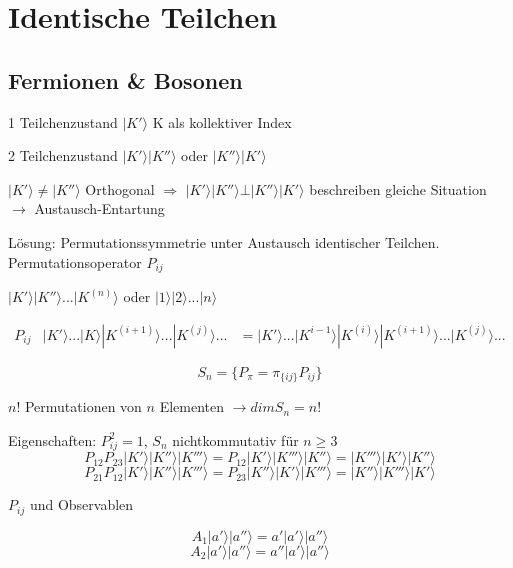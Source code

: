 



\tableofcontents
\setcounter{chapter}{3}
\chapter{Identische Teilchen}

\section{Fermionen \& Bosonen}

1 Teilchenzustand \(|K'\rangle \) K als kollektiver Index

2 Teilchenzustand \(|K'\rangle|K''\rangle \) oder \(|K''\rangle|K'\rangle \)

 \(|K'\rangle\neq |K''\rangle \) Orthogonal \(\Rightarrow \) \(|K'\rangle|K''\rangle \bot |K''\rangle|K'\rangle \) beschreiben gleiche Situation \(\rightarrow\) Austausch-Entartung

Lösung: Permutationssymmetrie unter Austausch identischer Teilchen. Permutationsoperator \(P_{ij}\)
 
\(|K'\rangle|K''\rangle...|K^{(n)}\rangle \) oder \(|1\rangle|2\rangle...|n\rangle \)

\begin{align}
P_{ij}&|K'\rangle ...|K\rangle|K^{(i+1)}\rangle ...|K^{(j)}\rangle ...
&=|K'\rangle ...|K^{i-1}\rangle|K^{(i)}\rangle|K^{(i+1)}\rangle ...|K^{(j)}\rangle ...
\end{align}

\[S_n = \{ P_\pi = \pi_{\{ij\}}P_{ij} \}\]

\(n!\) Permutationen von \(n\) Elementen \(\rightarrow dim S_n = n! \)

Eigenschaften: \(P^2_{ij}=1\), \(S_n\) nichtkommutativ für \(n\geq 3\)
\[P_{12}P_{23}|K'\rangle|K''\rangle|K'''\rangle= P_{12}|K'\rangle|K'''\rangle|K''\rangle= |K'''\rangle|K'\rangle|K''\rangle\]
\[P_{21}P_{12}|K'\rangle|K''\rangle|K'''\rangle= P_{23}|K''\rangle|K'\rangle|K'''\rangle= |K''\rangle|K'''\rangle|K'\rangle\]


\(P_{ij}\) und Observablen

\[A_1|a'\rangle |a''\rangle = a'|a'\rangle |a''\rangle\]
\[A_2|a'\rangle |a''\rangle = a''|a'\rangle |a''\rangle\]


